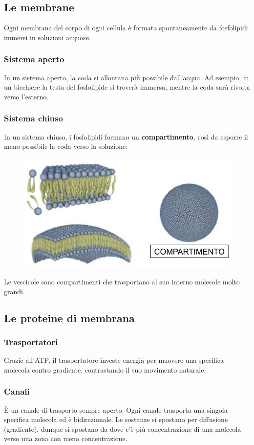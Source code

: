 \documentclass{article}
\begin{document}
\subsection{Le membrane}
Ogni membrana del corpo di ogni cellula è formata spontaneamente da fosfolipidi immersi in
soluzioni acquose.

\subsubsection{Sistema aperto}
In un sistema aperto, la coda si allontana più possibile dall'acqua. Ad esempio, in un bicchiere
la testa del fosfolipide si troverà immersa, mentre la coda sarà rivolta verso l'esterno.

\subsubsection{Sistema chiuso}
In un sistema chiuso, i fosfolipidi formano un \textbf{compartimento}, così da esporre il meno
possibile la coda verso la soluzione:
\begin{figure}[ht!]
    \begin{center}
        \includegraphics[width=.6\textwidth]{media/compartimento.png}
    \end{center}
\end{figure}
Le vescicole sono compartimenti che trasportano al suo interno molecole molto grandi.

\subsection{Le proteine di membrana}
\subsubsection{Trasportatori}
Grazie all'ATP, il trasportatore investe energia per muovere una specifica molecola contro
gradiente, contrastando il suo movimento naturale.

\subsubsection{Canali}
È un canale di trasporto sempre aperto. Ogni canale trasporta una singola specifica molecola ed
è bidirezionale. Le sostanze si spostano per diffusione (gradiente), dunque si spostano da
dove c'è più concentrazione di una molecola verso una zona con meno concentrazione.
\end{document}
